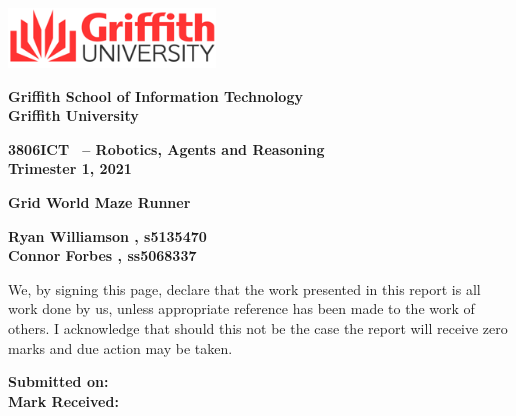 \documentclass[twoside, 12pt, a4paper]{article}
\newenvironment{myindentpar}[1]%
{\begin{list}{}%
		{\setlength{\leftmargin}{#1}}%
		\item[]%
	}
	{\end{list}}
\begin{document}
\begin{titlepage}
\begin{flushright}
	\includegraphics[height=60px]{griffithlogo.png}
\end{flushright}
\begin{large}
\textbf{Griffith School of Information Technology}\\
\textbf{Griffith University}

\vspace*{8mm}

\textbf{3806ICT \, -- Robotics, Agents and Reasoning}\\
\textbf{Trimester 1, 2021}
\end{large}

\vspace*{15mm}

\begin{Huge}
\textbf{Grid World Maze Runner}
\end{Huge}

\vspace*{5mm}
\begin{large}


\vspace*{8mm}

\textbf{Ryan Williamson , s5135470}\\
\textbf{Connor Forbes , ss5068337}

\vspace*{8mm}
\begin{myindentpar}{2cm}
 We, by signing this page, declare that the work presented in this report is all work done by us, unless appropriate reference has been made to the work of others. I acknowledge that should this not be the case the report will receive zero marks and due action may be taken.
\end{myindentpar}

\vspace{20mm}
\textbf{Submitted on: \underline{\hspace{50mm}  } }\\

\textbf{Mark Received: \underline{\hspace{50mm}  }  }

\end{large}


\vfill

\end{titlepage}
\end{document}
